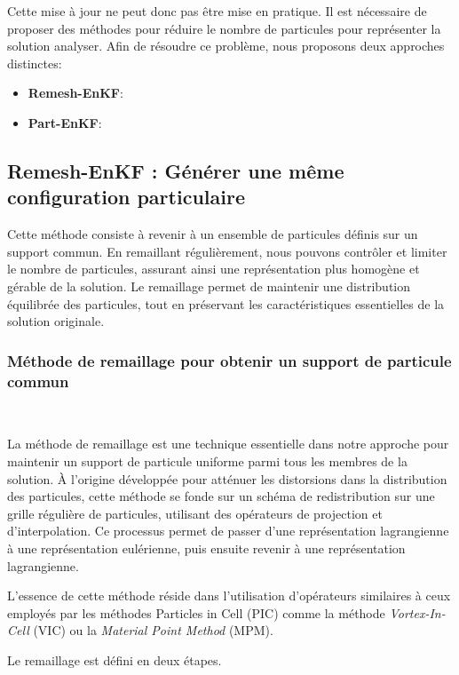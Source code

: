 Cette mise à jour ne peut donc pas être mise en pratique. Il est nécessaire de proposer des méthodes pour réduire le nombre de particules pour représenter la solution analyser. Afin de résoudre ce problème, nous proposons deux approches distinctes:

\begin{itemize}
    \item \textbf{Remesh-EnKF}: \\
    \item \textbf{Part-EnKF}: \\
\end{itemize}

\subsection{Remesh-EnKF : Générer une même configuration particulaire}

Cette méthode consiste à revenir à un ensemble de particules définis sur un support commun. En remaillant régulièrement, nous pouvons contrôler et limiter le nombre de particules, assurant ainsi une représentation plus homogène et gérable de la solution. Le remaillage permet de maintenir une distribution équilibrée des particules, tout en préservant les caractéristiques essentielles de la solution originale.

\subsubsection*{Méthode de remaillage pour obtenir un support de particule commun}~\label{sec:remesh}

La méthode de remaillage est une technique essentielle dans notre approche pour maintenir un support de particule uniforme parmi tous les membres de la solution. À l'origine développée pour atténuer les distorsions dans la distribution des particules, cette méthode se fonde sur un schéma de redistribution sur une grille régulière de particules, utilisant des opérateurs de projection et d'interpolation. Ce processus permet de passer d'une représentation lagrangienne à une représentation eulérienne, puis ensuite revenir à une représentation lagrangienne.

L'essence de cette méthode réside dans l'utilisation d'opérateurs similaires à ceux employés par les méthodes Particles in Cell (PIC) comme la méthode \textit{Vortex-In-Cell} (VIC) ou la \textit{Material Point Method} (MPM).

Le remaillage est défini en deux étapes.

